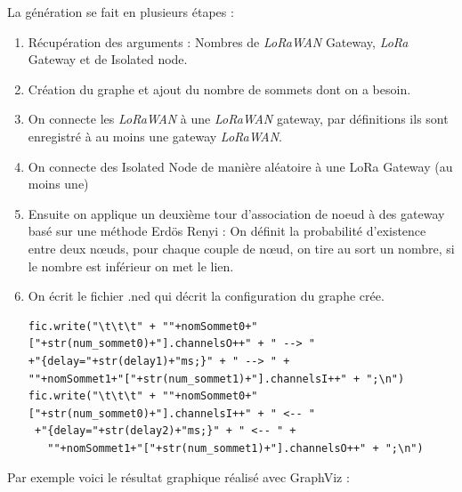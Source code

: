 \documentclass[11pt]{article}
\begin{document}
La génération se fait en plusieurs étapes : 
\begin{enumerate}
\item Récupération des arguments : Nombres de  \textit{LoRaWAN} Gateway, \textit{LoRa} Gateway et de Isolated node.	
\item Création du graphe et ajout du nombre de sommets dont on a besoin.
\item On connecte les  \textit{LoRaWAN} à une  \textit{LoRaWAN} gateway, par définitions ils sont enregistré à au moins une gateway  \textit{LoRaWAN}.
\item On connecte des Isolated Node de manière aléatoire à une LoRa Gateway (au moins une)
\item Ensuite on applique un deuxième tour d'association de noeud à des gateway 	basé sur une méthode  Erdös Renyi : On définit la probabilité d'existence entre deux nœuds, pour chaque couple de nœud, on tire au sort un nombre, si le nombre est inférieur on met le lien.
\item On écrit le fichier .ned qui décrit la configuration du graphe crée. 

\begin{verbatim}
fic.write("\t\t\t" + ""+nomSommet0+"["+str(num_sommet0)+"].channelsO++" + " --> "
+"{delay="+str(delay1)+"ms;}" + " --> " +
""+nomSommet1+"["+str(num_sommet1)+"].channelsI++" + ";\n")
fic.write("\t\t\t" + ""+nomSommet0+"["+str(num_sommet0)+"].channelsI++" + " <-- "
 +"{delay="+str(delay2)+"ms;}" + " <-- " +
   ""+nomSommet1+"["+str(num_sommet1)+"].channelsO++" + ";\n")
\end{verbatim}

\end{enumerate}
Par exemple voici le résultat graphique réalisé avec GraphViz :
\end{document}
